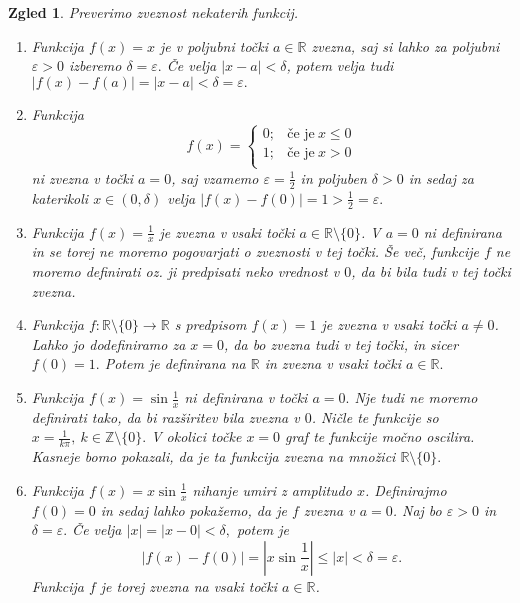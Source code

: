 \documentclass[10pt, a4paper]{article}
\newtheorem{zgled}{Zgled}[section]
\newcommand{\Z}{\mathbb {Z}}
\newcommand{\R}{\mathbb {R}}
\begin{document}
\begin{zgled}
    Preverimo zveznost nekaterih funkcij.
    \begin{enumerate}
        \item Funkcija $f(x)=x$ je v poljubni točki $a \in \R$ zvezna,
        saj si lahko za poljubni $\varepsilon > 0$ izberemo $\delta = \varepsilon.$ Če velja $|x-a|<\delta$, potem velja tudi
        $|f(x) - f(a)| = |x-a| < \delta = \varepsilon.$
        \item Funkcija $$f(x) = \begin{cases}
            0; &\text{če je}\ x \leq 0\\
            1; &\text{če je}\ x > 0\\
        \end{cases}$$
        ni zvezna v točki $a = 0$, saj vzamemo $\varepsilon = \frac{1}{2}$ in poljuben $\delta>0$ in sedaj za katerikoli $x \in (0, \delta)$ velja 
        $|f(x) - f(0)| = 1 > \frac{1}{2} = \varepsilon.$
        \item Funkcija $f(x) = \frac{1}{x}$ je zvezna v vsaki točki $a \in \R \setminus \{0\}$. V $a = 0$ ni definirana in se torej ne moremo pogovarjati o zveznosti v tej točki. Še več, funkcije $f$ ne moremo definirati
        oz. ji predpisati neko vrednost v $0$, da bi bila tudi v tej točki zvezna.
        \item Funkcija
        $f : \R \setminus \{0\} \rightarrow \R$ s predpisom $f(x) = 1$
        je zvezna v vsaki točki $a \neq 0$. Lahko jo dodefiniramo za $x = 0$, da bo zvezna tudi v tej točki, in sicer
        $f(0) = 1.$ Potem je definirana na $\R$ in zvezna v vsaki točki $a \in \R.$
        \item Funkcija $f(x) = \sin{\frac{1}{x}}$ ni definirana v točki $a = 0.$ Nje tudi ne moremo definirati tako, da bi razširitev bila zvezna v $0$. Ničle te funkcije so 
        $x = \frac{1}{k\pi},\ k \in \Z \setminus \{0\}.$ V okolici točke $x = 0$ graf te funkcije močno oscilira. Kasneje bomo pokazali, da je ta funkcija zvezna na množici $\R \setminus \{0\}.$
        \item Funkcija $f(x) = x\sin{\frac{1}{x}}$ nihanje umiri z amplitudo $x$. Definirajmo $f(0) = 0$ in sedaj lahko pokažemo, da je $f$ zvezna v $a = 0$.
        Naj bo $\varepsilon>0$ in $\delta = \varepsilon.$ Če velja $|x| = |x-0|< \delta,$ potem je
        $$|f(x) - f(0)| = \left|x \sin{\frac{1}{x}} \right| \leq |x| < \delta = \varepsilon.$$ Funkcija $f$ je torej zvezna na vsaki točki $a \in \R$.
    \end{enumerate}
\end{zgled}
\end{document}
